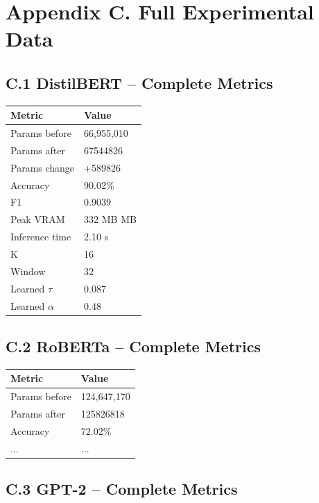 \section{Appendix C. Full Experimental Data}

\subsection{C.1 DistilBERT -- Complete Metrics}

\begin{table}[H]
\centering
\small
\begin{tabular}{ll}
\toprule
\textbf{Metric} & \textbf{Value} \\
\midrule
Params before & 66,955,010 \\
Params after & 67544826 \\
Params change & +589826 \\
Accuracy & 90.02\% \\
F1 & 0.9039 \\
Peak VRAM & 332 MB MB \\
Inference time & 2.10 s \\
K & 16 \\
Window & 32 \\
Learned $\tau$ & 0.087 \\
Learned $\alpha$ & 0.48 \\
\bottomrule
\end{tabular}
\end{table}

\subsection{C.2 RoBERTa -- Complete Metrics}

\begin{table}[H]
\centering
\small
\begin{tabular}{ll}
\toprule
\textbf{Metric} & \textbf{Value} \\
\midrule
Params before & 124,647,170 \\
Params after & 125826818 \\
Accuracy & 72.02\% \\
... & ... \\
\bottomrule
\end{tabular}
\end{table}

\subsection{C.3 GPT-2 -- Complete Metrics}

